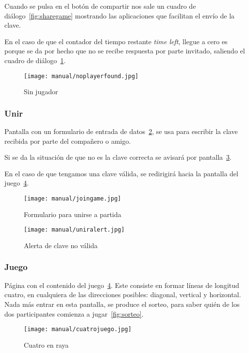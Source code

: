 Cuando se pulsa en el botón de compartir nos sale un cuadro de diálogo~\ref{fig:sharegame} mostrando las aplicaciones que facilitan el envío de la clave.

En el caso de que el contador del tiempo restante \emph{time left}, llegue a cero es porque se da por hecho que no se recibe respuesta por parte invitado, saliendo el cuadro de diálogo~\ref{fig:noplayerfound}.

\begin{figure}[H]
	\centering
	\texttt{[image: manual/noplayerfound.jpg]}
	\caption{Sin jugador}\label{fig:noplayerfound}
\end{figure}

\subsubsection{Unir}\label{cuatrounir}
Pantalla con un formulario de entrada de datos~\ref{fig:cuatrounir}, se usa para escribir la clave recibida por parte del compañero o amigo. 

Si se da la situación de que no es la clave correcta se avisará por pantalla~\ref{fig:uniralert}.

En el caso de que tengamos una clave válida, se redirigirá hacia la pantalla del juego~\ref{fig:cuatrojuego}.

\begin{figure}[H]
	\centering
	\texttt{[image: manual/joingame.jpg]}
	\caption{Formulario para unirse a partida}\label{fig:cuatrounir}
\end{figure}

\begin{figure}[H]
	\centering
	\texttt{[image: manual/uniralert.jpg]}
	\caption{Alerta de clave no válida}\label{fig:uniralert}
\end{figure}

\subsubsection{Juego}\label{cuatrojuego}
Página con el contenido del juego~\ref{fig:cuatrojuego}. Este consiste en formar líneas de longitud cuatro, en cualquiera de las direcciones posibles: diagonal, vertical y horizontal. Nada más entrar en esta pantalla, se produce el sorteo, para saber quién de los dos participantes comienza a jugar~\ref{fig:sorteo}.

\begin{figure}[H]
	\centering
	\texttt{[image: manual/cuatrojuego.jpg]}
	\caption{Cuatro en raya}\label{fig:cuatrojuego}
\end{figure}

